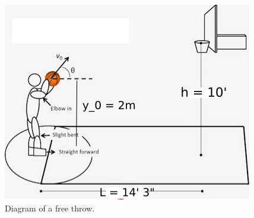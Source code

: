 \documentclass[12pt]{article}
\begin{document}
\begin{figure}[tbp]
\centering
\includegraphics[scale=0.75]{freethrow}
\caption{Diagram of a free throw.}
\end{figure}
\end{document}
